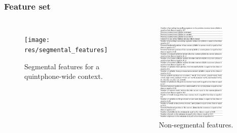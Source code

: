 \documentclass[a4paper,9pt]{beamer}
\theoremstyle{mytheoremstyle}
\begin{document}
\begin{frame}
\frametitle{Feature set}
\begin{columns}
\begin{figure}
\begin{center}
  \texttt{[image: res/segmental\_features]}
\end{center}
\caption{Segmental features for a quintphone-wide context.}
\end{figure}
\begin{figure}
\begin{center}
  \includegraphics[width=0.8\textwidth]{res/suprasegmental_features}
\end{center}
\caption{Non-segmental features.}
\end{figure}
\end{columns}
\end{frame}
\end{document}
